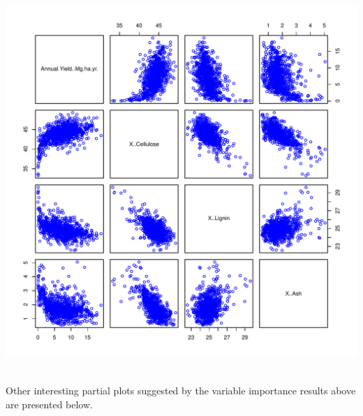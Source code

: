 \documentclass{article}\usepackage[]{graphicx}\usepackage[]{color}
\makeatletter
\def\maxwidth{ %
  \ifdim\Gin@nat@width>\linewidth
    \linewidth
  \else
    \Gin@nat@width
  \fi
}
\newenvironment{knitrout}{}{} %
\makeatother
\begin{document}
\begin{knitrout}
\color{fgcolor}

{\centering \includegraphics[width=\maxwidth]{figure/ScaterplotYieldComposition-1} 

}



\end{knitrout}
\\


Other interesting partial plots suggested by the variable importance results above are presented below.\\
\end{document}

